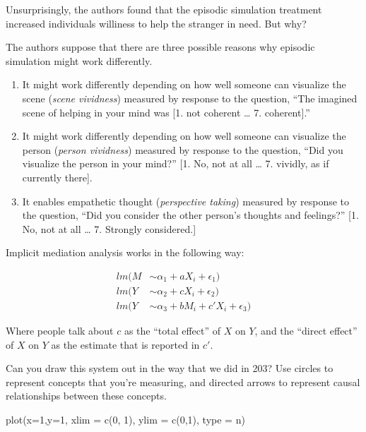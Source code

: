 \documentclass[
]{article}
\newenvironment{Shaded}{\begin{snugshade}}{\end{snugshade}}
\newcommand{\AttributeTok}[1]{\textcolor[rgb]{0.77,0.63,0.00}{#1}}
\newcommand{\DecValTok}[1]{\textcolor[rgb]{0.00,0.00,0.81}{#1}}
\newcommand{\FunctionTok}[1]{\textcolor[rgb]{0.00,0.00,0.00}{#1}}
\newcommand{\NormalTok}[1]{#1}
\newcommand{\StringTok}[1]{\textcolor[rgb]{0.31,0.60,0.02}{#1}}
\providecommand{\tightlist}{%
  \setlength{\itemsep}{0pt}\setlength{\parskip}{0pt}}
\begin{document}
Unsurprisingly, the authors found that the episodic simulation treatment increased individuals williness to help the stranger in need. But why?

The authors suppose that there are three possible reasons why episodic simulation might work differently.

\begin{enumerate}
\def\labelenumi{\arabic{enumi}.}
\tightlist
\item
  It might work differently depending on how well someone can visualize the scene (\emph{scene vividness}) measured by response to the question, ``The imagined scene of helping in your mind was {[}1. not coherent \ldots{} 7. coherent{]}.''
\item
  It might work differently depending on how well someone can visualize the person (\emph{person vividness}) measured by response to the question, ``Did you visualize the person in your mind?'' {[}1. No, not at all \ldots{} 7. vividly, as if currently there{]}.
\item
  It enables empathetic thought (\emph{perspective taking}) measured by response to the question, ``Did you consider the other person's thoughts and feelings?'' {[}1. No, not at all \ldots{} 7. Strongly considered.{]}
\end{enumerate}

Implicit mediation analysis works in the following way:

\[
  \begin{aligned}
    lm(M &\sim \alpha_{1} + aX_{i} + \epsilon_{1}) \\ 
    lm(Y &\sim \alpha_{2} + cX_{i} + \epsilon_{2}) \\ 
    lm(Y &\sim \alpha_{3} + bM_{i} + c'X_{i} + \epsilon_{3})
  \end{aligned}
\]

Where people talk about \(c\) as the ``total effect'' of \(X\) on \(Y\), and the ``direct effect'' of \(X\) on \(Y\) as the estimate that is reported in \(c'\).

Can you draw this system out in the way that we did in 203? Use circles to represent concepts that you're measuring, and directed arrows to represent causal relationships between these concepts.

\begin{Shaded}
\begin{Highlighting}[]
\FunctionTok{plot}\NormalTok{(}\AttributeTok{x=}\DecValTok{1}\NormalTok{,}\AttributeTok{y=}\DecValTok{1}\NormalTok{, }\AttributeTok{xlim =} \FunctionTok{c}\NormalTok{(}\DecValTok{0}\NormalTok{, }\DecValTok{1}\NormalTok{), }\AttributeTok{ylim =} \FunctionTok{c}\NormalTok{(}\DecValTok{0}\NormalTok{,}\DecValTok{1}\NormalTok{), }\AttributeTok{type =} \StringTok{\textquotesingle{}n\textquotesingle{}}\NormalTok{)}
\end{Highlighting}
\end{Shaded}
\end{document}
